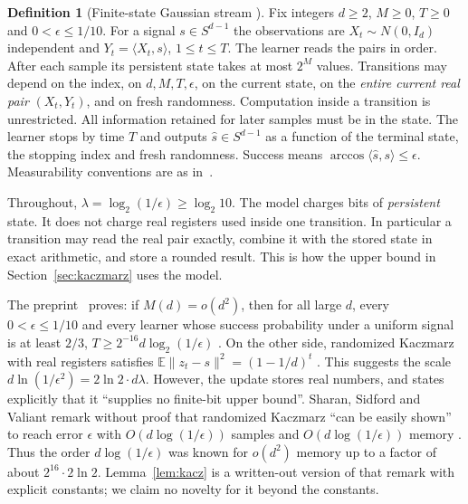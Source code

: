 \documentclass[11pt]{article}
\theoremstyle{definition}
\newtheorem{definition}[theorem]{Definition}
\theoremstyle{remark}
\newcommand{\E}{\mathbb E}
\newcommand{\ip}[2]{\langle #1,#2\rangle}
\newcommand{\norm}[1]{\lVert #1\rVert}
\begin{document}
\begin{definition}[Finite-state Gaussian stream {\cite[Definition~1.1]{OAIsub}}]\label{def:model}
Fix integers \(d\ge2\), \(M\ge0\), \(T\ge0\) and \(0<\epsilon\le 1/10\).
For a signal \(s\in S^{d-1}\) the observations are \(X_t\sim N(0,I_d)\)
independent and \(Y_t=\ip{X_t}{s}\), \(1\le t\le T\). The learner reads the
pairs in order. After each sample its persistent state takes at most
\(2^M\) values. Transitions may depend on the index, on
\(d,M,T,\epsilon\), on the current state, on the \emph{entire current real pair}
\((X_t,Y_t)\), and on fresh randomness. Computation inside a
transition is unrestricted. All information retained for later
samples must be in the state. The learner stops by time \(T\) and
outputs \(\widehat s\in S^{d-1}\) as a function of the terminal state,
the stopping index and fresh randomness. Success means
\(\arccos\ip{\widehat s}{s}\le\epsilon\).
Measurability conventions are as in~\cite{OAIsub}.
\end{definition}

Throughout, \(\lambda=\log_2(1/\epsilon)\ge\log_2 10\). The model
charges bits of \emph{persistent} state. It does not charge real registers used inside one transition.
In particular a transition may read the real pair exactly, combine it with the
stored state in exact arithmetic, and store a rounded result. This is
how the upper bound in Section~\ref{sec:kaczmarz} uses the model.

The preprint~\cite{OAIsub} proves: if \(M(d)=o(d^2)\), then for all
large \(d\), every \(0<\epsilon\le1/10\) and every learner whose
success probability under a uniform signal is at least \(2/3\),
\(T\ge 2^{-16}d\log_2(1/\epsilon)\) \cite[Theorem~1.2]{OAIsub}. On
the other side, randomized Kaczmarz~\cite{Kac37,SV09} with real registers satisfies
\(\E\norm{z_t-s}^2=(1-1/d)^t\) \cite[\S1.2, eq.~(2); source \texttt{introduction.tex}:201--227]{OAImem}. This suggests
the scale \(d\ln(1/\epsilon^2)=2\ln2\cdot d\lambda\). However, the update stores
real numbers, and \cite{OAImem} states explicitly that it ``supplies no
finite-bit upper bound''. Sharan, Sidford and Valiant remark without proof that randomized Kaczmarz
``can be easily shown'' to reach error \(\epsilon\) with \(O(d\log(1/\epsilon))\) samples and \(O(d\log(1/\epsilon))\) memory
\cite[\S1.1]{SSV19}. Thus the order \(d\log(1/\epsilon)\) was known
for \(o(d^2)\) memory up to a factor of about \(2^{16}\cdot 2\ln 2\). Lemma~\ref{lem:kacz} is a written-out version
of that remark with explicit constants; we claim no novelty for it beyond the constants.
\end{document}

